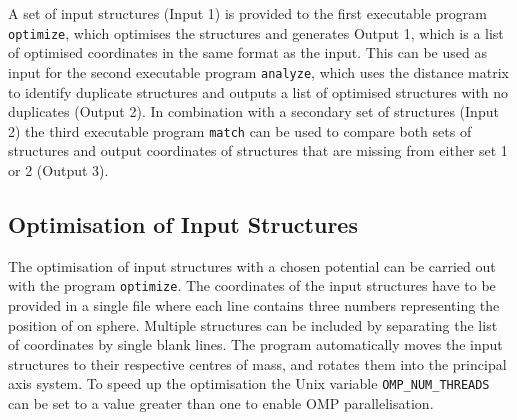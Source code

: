 %
A set of input structures (Input 1) is provided to the first executable program
\texttt{optimize}, which optimises the structures and generates Output 1, which
is a list of optimised coordinates in the same format as the input. This can be
used as input for the second executable program \texttt{analyze}, which uses
the distance matrix to identify duplicate structures and outputs a list of
optimised structures with no duplicates (Output 2). In combination with a
secondary set of structures (Input 2) the third executable program
\texttt{match} can be used to compare both sets of structures and output
coordinates of structures that are missing from either set 1 or 2 (Output 3). 

\subsection{Optimisation of Input Structures}
\label{sec:optimisationofinputstructures}

The optimisation of input structures with a chosen potential can be carried out
with the program \texttt{optimize}. The coordinates of the input structures
have to be provided in a single file where each line contains three numbers
representing the position of on sphere. Multiple structures can be included by
separating the list of coordinates by single blank lines. The program
automatically moves the input structures to their respective centres of mass,
and rotates them into the principal axis system. To speed up the optimisation
the Unix variable \texttt{OMP\_NUM\_THREADS} can be set to a value
greater than one to enable \ac{OMP} parallelisation.

